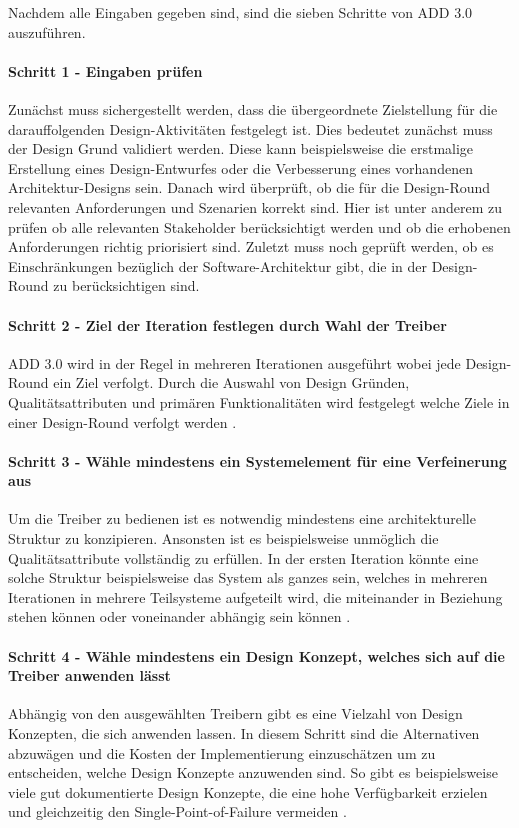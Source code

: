 Nachdem alle Eingaben gegeben sind, sind die sieben Schritte von ADD 3.0 auszuführen.\\

\paragraph{Schritt 1 - Eingaben prüfen}
Zunächst muss sichergestellt werden, dass die übergeordnete Zielstellung für die darauffolgenden Design-Aktivitäten festgelegt ist. Dies bedeutet zunächst muss der Design Grund validiert werden. Diese kann beispielsweise die erstmalige Erstellung eines Design-Entwurfes oder die Verbesserung eines vorhandenen Architektur-Designs sein. Danach wird überprüft, ob die für die Design-Round relevanten Anforderungen und Szenarien korrekt sind. Hier ist unter anderem zu prüfen ob alle relevanten Stakeholder berücksichtigt werden und ob die erhobenen Anforderungen richtig priorisiert sind. Zuletzt muss noch geprüft werden, ob es Einschränkungen bezüglich der Software-Architektur gibt, die in der Design-Round zu berücksichtigen sind.\\

\paragraph{Schritt 2 - Ziel der Iteration festlegen durch Wahl der Treiber}
ADD 3.0 wird in der Regel in mehreren Iterationen ausgeführt wobei jede Design-Round ein Ziel verfolgt. Durch die Auswahl von Design Gründen, Qualitätsattributen und primären Funktionalitäten wird festgelegt welche Ziele in einer Design-Round verfolgt werden \cite{Cer01}.\\

\paragraph{Schritt 3 - Wähle mindestens ein Systemelement für eine Verfeinerung aus}
Um die Treiber zu bedienen ist es notwendig mindestens eine architekturelle Struktur zu konzipieren. Ansonsten ist es beispielsweise unmöglich die Qualitätsattribute vollständig zu erfüllen. In der ersten Iteration könnte eine solche Struktur beispielsweise das System als ganzes sein, welches in mehreren Iterationen in mehrere Teilsysteme aufgeteilt wird, die miteinander in Beziehung stehen können oder voneinander abhängig sein können \cite{Cer01}.\\

\paragraph{Schritt 4 - Wähle mindestens ein Design Konzept, welches sich auf die Treiber anwenden lässt}
Abhängig von den ausgewählten Treibern gibt es eine Vielzahl von Design Konzepten, die sich anwenden lassen. In diesem Schritt sind die Alternativen abzuwägen und die Kosten der Implementierung einzuschätzen um zu entscheiden, welche Design Konzepte anzuwenden sind. So gibt es beispielsweise viele gut dokumentierte Design Konzepte, die eine hohe Verfügbarkeit erzielen und gleichzeitig den Single-Point-of-Failure vermeiden \cite{Cer01}.\\

